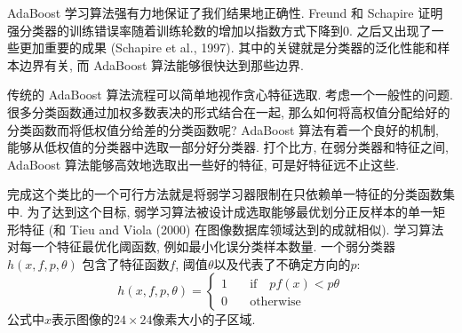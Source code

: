 \documentclass[a4paper,utf8,11pt, onecolumn]{ctexart}
\begin{document}
AdaBoost 学习算法强有力地保证了我们结果地正确性. Freund 和 Schapire 证明强分类器的训练错误率随着训练轮数的增加以指数方式下降到$0$. 之后又出现了一些更加重要的成果 (Schapire et al., 1997). 其中的关键就是分类器的泛化性能和样本边界有关, 而 AdaBoost 算法能够很快达到那些边界.

传统的 AdaBoost 算法流程可以简单地视作贪心特征选取. 考虑一个一般性的问题. 很多分类函数通过加权多数表决的形式结合在一起, 那么如何将高权值分配给好的分类函数而将低权值分给差的分类函数呢? 
AdaBoost 算法有着一个良好的机制, 能够从低权值的分类器中选取一部分好分类器. 打个比方, 在弱分类器和特征之间, AdaBoost 算法能够高效地选取出一些好的特征, 可是好特征远不止这些.

完成这个类比的一个可行方法就是将弱学习器限制在只依赖单一特征的分类函数集中. 为了达到这个目标, 弱学习算法被设计成选取能够最优划分正反样本的单一矩形特征 (和 Tieu and Viola (2000) 在图像数据库领域达到的成就相似). 学习算法对每一个特征最优化阈函数, 例如最小化误分类样本数量. 一个弱分类器 $h(x,f,p,\theta)$ 包含了特征函数$f$, 阈值$\theta$以及代表了不确定方向的$p$:
\[
    h(x,f,p,\theta) =
    \begin{cases}
        1 &\quad\text{if}\quad pf(x)<p\theta \\
        0 &\quad\text{otherwise}
    \end{cases}
\]
公式中$x$表示图像的$24\times24$像素大小的子区域.
\end{document}
